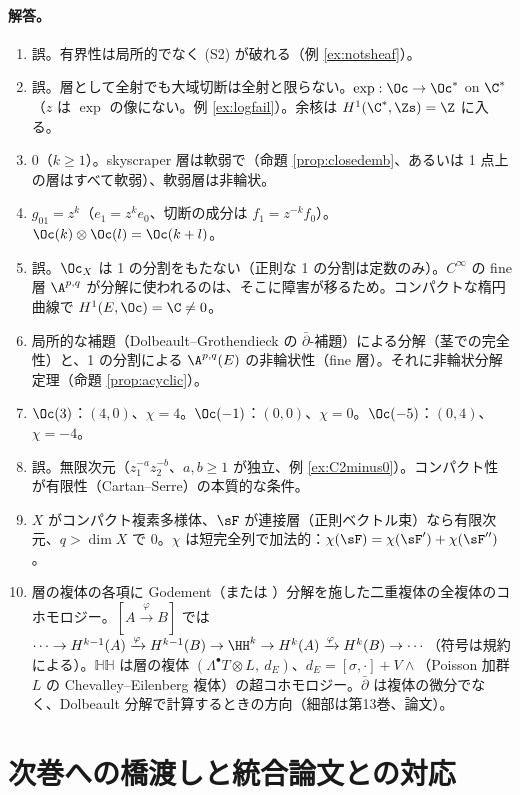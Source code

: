 \paragraph{解答。}
\begin{enumerate}[label=\textbf{A\arabic*.},leftmargin=2.4em]
\item 誤。有界性は局所的でなく (S2) が破れる（例 \ref{ex:notsheaf}）。
\item 誤。層として全射でも大域切断は全射と限らない。$\exp:\Oc\to\Oc^*$ on $\C^*$（$z$ は $\exp$ の像にない。例 \ref{ex:logfail}）。余核は $H^1(\C^*,\Zs)=\Z$ に入る。
\item $0$（$k\ge1$）。skyscraper 層は軟弱で（命題 \ref{prop:closedemb}、あるいは 1 点上の層はすべて軟弱）、軟弱層は非輪状。
\item $g_{01}=z^k$（$e_1=z^ke_0$、切断の成分は $f_1=z^{-k}f_0$）。$\Oc(k)\otimes\Oc(l)=\Oc(k+l)$。
\item 誤。$\Oc_X$ は 1 の分割をもたない（正則な 1 の分割は定数のみ）。$C^\infty$ の fine 層 $\A^{p,q}$ が分解に使われるのは、そこに障害が移るため。コンパクトな楕円曲線で $H^1(E,\Oc)=\C\ne0$。
\item 局所的な補題（Dolbeault--Grothendieck の $\bar\partial$-補題）による分解（茎での完全性）と、1 の分割による $\A^{p,q}(E)$ の非輪状性（fine 層）。それに非輪状分解定理（命題 \ref{prop:acyclic}）。
\item $\Oc(3)$：$(4,0)$、$\chi=4$。$\Oc(-1)$：$(0,0)$、$\chi=0$。$\Oc(-5)$：$(0,4)$、$\chi=-4$。
\item 誤。無限次元（$z_1^{-a}z_2^{-b}$、$a,b\ge1$ が独立、例 \ref{ex:C2minus0}）。コンパクト性が有限性（Cartan--Serre）の本質的な条件。
\item $X$ がコンパクト複素多様体、$\sF$ が連接層（正則ベクトル束）なら有限次元、$q>\dim X$ で $0$。$\chi$ は短完全列で加法的：$\chi(\sF)=\chi(\sF')+\chi(\sF'')$。
\item 層の複体の各項に Godement（または \Cech{}）分解を施した二重複体の全複体のコホモロジー。$[A\xrightarrow{\varphi}B]$ では $\cdots\to H^{k-1}(A)\xrightarrow{\varphi}H^{k-1}(B)\to\HH^k\to H^k(A)\xrightarrow{\varphi}H^k(B)\to\cdots$（符号は規約による）。$\mathbb{HH}$ は層の複体 $(\Lambda^\bullet T\otimes L,\ d_E)$、$d_E=[\sigma,\cdot]+V\wedge$（Poisson 加群 $L$ の Chevalley--Eilenberg 複体）の超コホモロジー。$\bar\partial$ は複体の微分でなく、Dolbeault 分解で計算するときの方向（細部は第13巻、論文）。
\end{enumerate}

\section{次巻への橋渡しと統合論文との対応}\label{sec:bridge}
